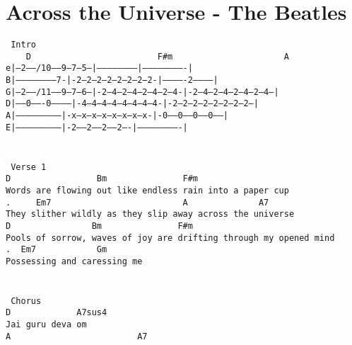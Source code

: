 \newpage
\section{Across the Universe - The Beatles}
\label{Across the Universe - The Beatles}
\texttt{\lbrack\ Intro\rbrack\\
\ \ \ \ D\ \ \ \ \ \ \ \ \ \ \ \ \ \ \ \ \ \ \ \ \ \ \ \ \ F\#m\ \ \ \ \ \ \ \ \ \ \ \ \ \ \ \ \ \ \ \ \ \ A\\
e|--2-----/10-----9--7--5---|------------------------|-------------------------|\\
B|------------------------7-|-2--2--2--2--2--2--2--2-|-------------2-----------|\\
G|--2-----/11-----9--7--6---|-2--4--2--4--2--4--2--4-|-2--4--2--4--2--4--2--4--|\\
D|-----0-------0------------|-4--4--4--4--4--4--4--4-|-2--2--2--2--2--2--2--2--|\\
A|--------------------------|-x--x--x--x--x--x--x--x-|-0-----0-----0-----0-----|\\
E|--------------------------|-2-----2-----2-----2----|-------------------------|\\
\\
\\
\lbrack\ Verse\ 1\rbrack\\
D\ \ \ \ \ \ \ \ \ \ \ \ \ \ \ \ \ Bm\ \ \ \ \ \ \ \ \ \ \ \ \ \ \ F\#m\\
Words\ are\ flowing\ out\ like\ endless\ rain\ into\ a\ paper\ cup\\
.\ \ \ \ \ Em7\ \ \ \ \ \ \ \ \ \ \ \ \ \ \ \ \ \ \ \ \ \ \ \ \ \ A\ \ \ \ \ \ \ \ \ \ \ \ \ \ A7\\
They\ slither\ wildly\ as\ they\ slip\ away\ across\ the\ universe\\
D\ \ \ \ \ \ \ \ \ \ \ \ \ \ \ \ Bm\ \ \ \ \ \ \ \ \ \ \ \ \ \ \ F\#m\\
Pools\ of\ sorrow,\ waves\ of\ joy\ are\ drifting\ through\ my\ opened\ mind\\
.\ \ Em7\ \ \ \ \ \ \ \ \ \ \ \ Gm\\
Possessing\ and\ caressing\ me\\
\\
\\
\lbrack\ Chorus\rbrack\\
D\ \ \ \ \ \ \ \ \ \ \ \ \ A7sus4\\
Jai\ guru\ deva\ om\\
A\ \ \ \ \ \ \ \ \ \ \ \ \ \ \ \ \ \ \ \ \ \ \ \ \ A7\\
}
